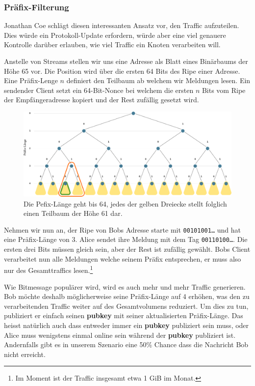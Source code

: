 \documentclass{bfh}
\newcommand{\obj}[1]{\textbf{\textcolor{OliveGreen}{#1}}}
\begin{document}
  \subsubsection{Präfix-Filterung}
  Jonathan Coe schlägt diesen interessanten Ansatz vor, den Traffic aufzuteilen. Dies würde ein Protokoll-Update erfordern, würde aber eine viel genauere Kontrolle darüber erlauben, wie viel Traffic ein Knoten verarbeiten will.\cite{wiki:prefixfilter}

  Anstelle von Streams stellen wir uns eine Adresse als Blatt eines Binärbaums der Höhe 65 vor. Die Position wird über die ersten 64 Bits des Ripe einer Adresse. Eine Präfix-Lenge $n$ definiert den Teilbaum ab welchem wir Meldungen lesen. Ein sendender Client setzt ein 64-Bit-Nonce bei welchem die ersten $n$ Bits vom Ripe der Empfängeradresse kopiert und der Rest zufällig gesetzt wird.

  \begin{figure}[htp]
  \centering
  \includegraphics[width=\textwidth]{images/prefix-filter-binary-tree.pdf}
  \caption[Präfix-Filter: Binärbaum]{Die Pefix-Länge geht bis 64, jedes der gelben Dreiecke stellt folglich einen Teilbaum der Höhe 61 dar.}
  \label{fig:bintree}
  \end{figure}

  Nehmen wir nun an, der Ripe von Bobs Adresse starte mit \texttt{00101001\ldots} und hat eine Präfix-Länge von 3. Alice sendet ihre Meldung mit dem Tag \texttt{00110100\ldots}. Die ersten drei Bits müssen gleich sein, aber der Rest ist zufällig gewählt. Bobs Client verarbeitet nun alle Meldungen welche seinem Präfix entsprechen, er muss also nur  des Gesamttraffics lesen.\footnote{Im Moment ist der Traffic insgesamt etwa 1 GiB im Monat.}

  Wie Bitmessage populärer wird, wird es auch mehr und mehr Traffic generieren. Bob möchte deshalb möglicherweise seine Präfix-Länge auf 4 erhöhen, was den zu verarbeitenden Traffic weiter auf  des Gesamtvolumens reduziert. Um dies zu tun, publiziert er einfach seinen \obj{pubkey} mit seiner aktualisierten Präfix-Länge. Das heisst natürlich auch dass entweder immer ein \obj{pubkey} publiziert sein muss, oder Alice muss wenigstens einmal online sein während der \obj{pubkey} publiziert ist. Andernfalls gibt es in unserem Szenario eine 50\% Chance dass die Nachricht Bob nicht erreicht.
\end{document}
